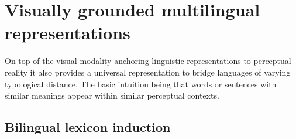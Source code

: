 
\section{Visually grounded multilingual representations}
\label{sec:vismulti}

On top of the visual modality anchoring linguistic representations to perceptual reality it
also provides a universal representation to bridge languages of varying typological distance.
The basic intuition being that words or sentences with similar meanings appear
within similar perceptual contexts.

\subsection{Bilingual lexicon induction}
\label{sec:bilinglex}

